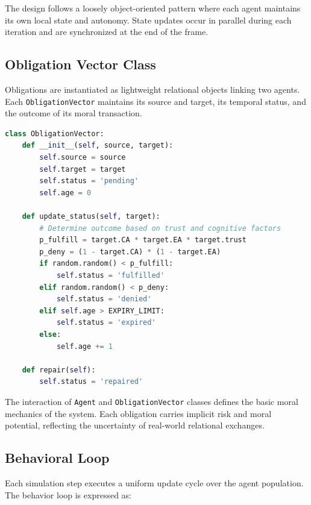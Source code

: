 \documentclass[11pt]{article}
\begin{document}
The design follows a loosely object-oriented pattern where each agent maintains its own local state and autonomy. State updates occur in parallel during each iteration and are synchronized at the end of the frame.

\subsection{Obligation Vector Class}

Obligations are instantiated as lightweight relational objects linking two agents. Each \texttt{ObligationVector} maintains its source and target, its temporal status, and the outcome of its moral transaction.

\begin{lstlisting}[language=Python,caption={ObligationVector class structure (pseudocode)}]
class ObligationVector:
    def __init__(self, source, target):
        self.source = source
        self.target = target
        self.status = 'pending'
        self.age = 0

    def update_status(self, target):
        # Determine outcome based on trust and cognitive factors
        p_fulfill = target.CA * target.EA * target.trust
        p_deny = (1 - target.CA) * (1 - target.EA)
        if random.random() < p_fulfill:
            self.status = 'fulfilled'
        elif random.random() < p_deny:
            self.status = 'denied'
        elif self.age > EXPIRY_LIMIT:
            self.status = 'expired'
        else:
            self.age += 1

    def repair(self):
        self.status = 'repaired'
\end{lstlisting}

The interaction of \texttt{Agent} and \texttt{ObligationVector} classes defines the basic moral mechanics of the system. Each obligation carries implicit risk and moral potential, reflecting the uncertainty of real-world relational exchanges.

\subsection{Behavioral Loop}

Each simulation step executes a uniform update cycle over the agent population. The behavior loop is expressed as:
\end{document}
